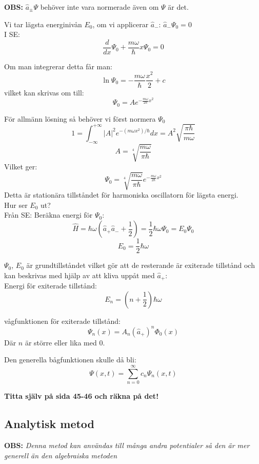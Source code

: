 \documentclass{article}
\begin{document}
\textbf{OBS:} $\hat{a}_{\pm}\Psi$ behöver inte vara normerade även om $\Psi$ är det.

Vi tar lägsta energinivån $E_0$, om vi applicerar $\hat{a}_-$: $\hat{a}_-\Psi_0=0$\\

I SE:
\[
  \frac{d}{dx}\Psi_0+\frac{m\omega}{\hbar}x\Psi_0=0
\]

Om man integrerar detta får man:
\[
  \ln{\Psi_0}=-\frac{m\omega}{\hbar}\frac{x^2}{2}+c
\]
vilket kan skrivas om till:
\[
  \Psi_0=Ae^{-\frac{m\omega}{2\hbar}x^2}
\]

För allmänn lösning så behöver vi först normera $\Psi_0$
\[
  1=\int_{-\infty}^{+\infty}|A|^2e^{-(m\omega x^2)/\hbar}dx=A^2\sqrt{\frac{\pi\hbar}{m\omega}}
\]
\[
  A =\sqrt[4]{\frac{m\omega}{\pi\hbar}}
\]
Vilket ger:
\[
  \Psi_0=\sqrt[4]{\frac{m\omega}{\pi\hbar}}e^{-\frac{m\omega}{2\hbar}x^2}
\]
Detta är stationära tillståndet för harmoniska oscillatorn för lägsta energi.\\

Hur ser $E_0$ ut?\\
Från SE: Beräkna energi för $\Psi_0$:
\[
  \hat{H}=\hbar\omega(\hat{a}_+\hat{a}_-+\frac{1}{2})=\frac{1}{2}\hbar\omega\Psi_0=E_0\Psi_0
\]
\[
  E_0=\frac{1}{2}\hbar\omega
\]

$\Psi_0$, $E_0$ är grundtillståndet vilket gör att de resterande är exiterade tillstånd och kan beskrivas med hjälp av att kliva uppåt med $\hat{a}_+$:\\

Energi för exiterade tillstånd:
\[
  E_n=(n+\frac{1}{2})\hbar \omega
\]

vågfunktionen för exiterade tillstånd:
\[
  \Psi_n(x)=A_n(\hat{a}_+)^n\Phi_0(x)
\]
Där $n$ är större eller lika med $0$.

Den generella bågfunktionen skulle då bli:
\[
  \Psi(x,t)=\sum_{n=0}^{\infty}c_n\Psi_n(x,t)
\]

\textbf{Titta själv på sida 45-46 och räkna på det!}
  \newpage
  \subsection{Analytisk metod}
    \textbf{OBS:} \textit{Denna metod kan användas till många andra potentialer så den är mer generell än den algebraiska metoden}\\
\end{document}
